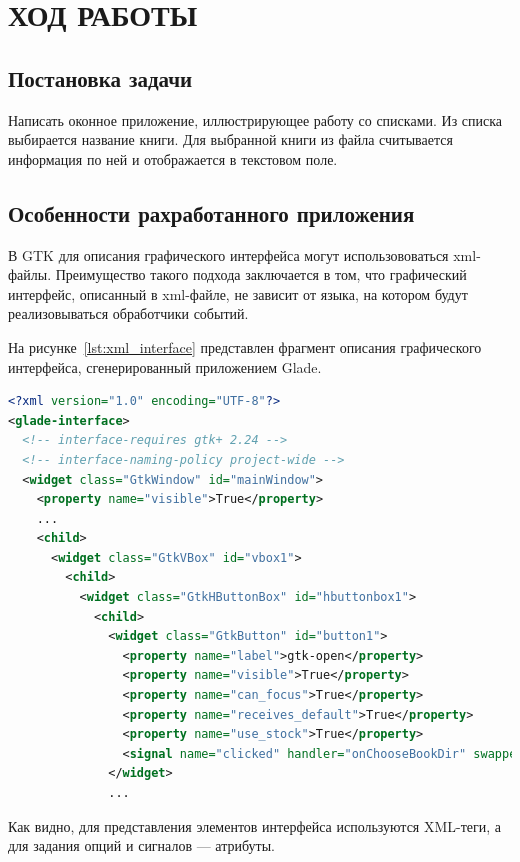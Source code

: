 \section{ХОД РАБОТЫ}

\subsection{Постановка задачи}

Написать оконное приложение, иллюстрирующее работу со списками.
Из списка выбирается название книги. Для выбранной книги из
файла считывается информация по ней и отображается в текстовом поле.

\subsection{Особенности рахработанного приложения}

В GTK для описания графического интерфейса могут использововаться xml-файлы.
Преимущество такого подхода заключается в том, что графический интерфейс,
описанный в xml-файле, не зависит от языка, на котором будут реализовываться
обработчики событий.

На рисунке~\ref{lst:xml_interface} представлен фрагмент описания графического 
интерфейса, сгенерированный приложением Glade.

\begin{lstlisting}[caption=Фрагмент описания графического интерфейса приложения,
label=lst:xml_interface,language={xml},basicstyle=\scriptsize\ttfamily]
<?xml version="1.0" encoding="UTF-8"?>
<glade-interface>
  <!-- interface-requires gtk+ 2.24 -->
  <!-- interface-naming-policy project-wide -->
  <widget class="GtkWindow" id="mainWindow">
    <property name="visible">True</property>
    ...
    <child>
      <widget class="GtkVBox" id="vbox1">
        <child>
          <widget class="GtkHButtonBox" id="hbuttonbox1">
            <child>
              <widget class="GtkButton" id="button1">
                <property name="label">gtk-open</property>
                <property name="visible">True</property>
                <property name="can_focus">True</property>
                <property name="receives_default">True</property>
                <property name="use_stock">True</property>
                <signal name="clicked" handler="onChooseBookDir" swapped="no"/>
              </widget>
              ...
\end{lstlisting}

Как видно, для представления элементов интерфейса используются XML-теги,
а для задания опций и сигналов --- атрибуты.


